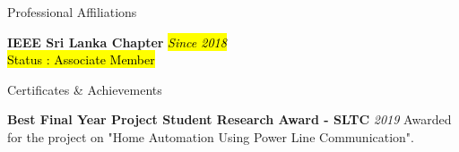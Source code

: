 \documentclass[
	11pt, %
]{./assets/resume} %
\begin{document}









\begin{rSection}{Professional Affiliations}

	\textbf{IEEE Sri Lanka Chapter} \hfill \hl{\textit{Since 2018}} \\ 
	\hl{Status : Associate Member}

\end{rSection}


\begin{rSection}{Certificates \& Achievements}

	\textbf{Best Final Year Project Student Research Award - SLTC} \hfill \textit{2019}
    Awarded for the project on "Home Automation Using Power Line Communication".

\end{rSection}
\end{document}

